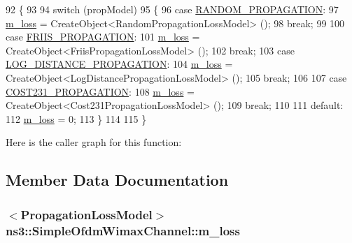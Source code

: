 \begin{DoxyCode}
92 \{
93 
94   \textcolor{keywordflow}{switch} (propModel)
95     \{
96     \textcolor{keywordflow}{case} \hyperlink{classns3_1_1SimpleOfdmWimaxChannel_ad8299e6adf4848b1cf213df963e94842a5e9e492c176e43488bc29bc8b81115a3}{RANDOM\_PROPAGATION}:
97       \hyperlink{classns3_1_1SimpleOfdmWimaxChannel_a0f7cdabc0c8ce4957eeb63b98bf27b1a}{m\_loss} = CreateObject<RandomPropagationLossModel> ();
98       \textcolor{keywordflow}{break};
99 
100     \textcolor{keywordflow}{case} \hyperlink{classns3_1_1SimpleOfdmWimaxChannel_ad8299e6adf4848b1cf213df963e94842a3a15cb0de31fe3061af5cb809f52356b}{FRIIS\_PROPAGATION}:
101       \hyperlink{classns3_1_1SimpleOfdmWimaxChannel_a0f7cdabc0c8ce4957eeb63b98bf27b1a}{m\_loss} = CreateObject<FriisPropagationLossModel> ();
102       \textcolor{keywordflow}{break};
103     \textcolor{keywordflow}{case} \hyperlink{classns3_1_1SimpleOfdmWimaxChannel_ad8299e6adf4848b1cf213df963e94842a95e3aed3c123d1be9fa29d40bb47cef3}{LOG\_DISTANCE\_PROPAGATION}:
104       \hyperlink{classns3_1_1SimpleOfdmWimaxChannel_a0f7cdabc0c8ce4957eeb63b98bf27b1a}{m\_loss} = CreateObject<LogDistancePropagationLossModel> ();
105       \textcolor{keywordflow}{break};
106 
107     \textcolor{keywordflow}{case} \hyperlink{classns3_1_1SimpleOfdmWimaxChannel_ad8299e6adf4848b1cf213df963e94842a3a47ef0ca6f1074cceda8963d4b11a63}{COST231\_PROPAGATION}:
108       \hyperlink{classns3_1_1SimpleOfdmWimaxChannel_a0f7cdabc0c8ce4957eeb63b98bf27b1a}{m\_loss} = CreateObject<Cost231PropagationLossModel> ();
109       \textcolor{keywordflow}{break};
110 
111     \textcolor{keywordflow}{default}:
112       \hyperlink{classns3_1_1SimpleOfdmWimaxChannel_a0f7cdabc0c8ce4957eeb63b98bf27b1a}{m\_loss} = 0;
113     \}
114 
115 \}
\end{DoxyCode}


Here is the caller graph for this function\+:




\subsection{Member Data Documentation}
\subsubsection[{\texorpdfstring{m\+\_\+loss}{m_loss}}]{$<${\bf Propagation\+Loss\+Model}$>$ ns3\+::\+Simple\+Ofdm\+Wimax\+Channel\+::m\+\_\+loss\hspace{0.3cm}{\ttfamily [private]}}\hypertarget{classns3_1_1SimpleOfdmWimaxChannel_a0f7cdabc0c8ce4957eeb63b98bf27b1a}{}\label{classns3_1_1SimpleOfdmWimaxChannel_a0f7cdabc0c8ce4957eeb63b98bf27b1a}


